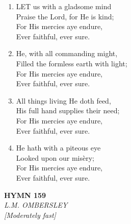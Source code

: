 \documentclass[11pt,a4paper]{article}
\begin{document}
\begin{enumerate}
    \item LET us with a gladsome mind \\
        Praise the Lord, for He is kind; \\
        For His mercies aye endure, \\
        Ever faithful, ever sure.

    \item He, with all commanding might, \\
        Filled the formless earth with light; \\
        For His mercies aye endure, \\
        Ever faithful, ever sure.

    \item All things living He doth feed, \\
        His full hand supplies their need; \\
        For His mercies aye endure, \\
        Ever faithful, ever sure.

    \item He hath with a piteous eye \\
        Looked upon our mis\`ery; \\
        For His mercies aye endure, \\
        Ever faithful, ever sure.

\end{enumerate}

\newpage
\begin{center}
    {\Large \textbf{HYMN 159}}
    \\
    \textit{L.M. OMBERSLEY}
    \\
    \textit{\small [Moderately fast]}
\end{center}
\vspace{1em}
\end{document}
